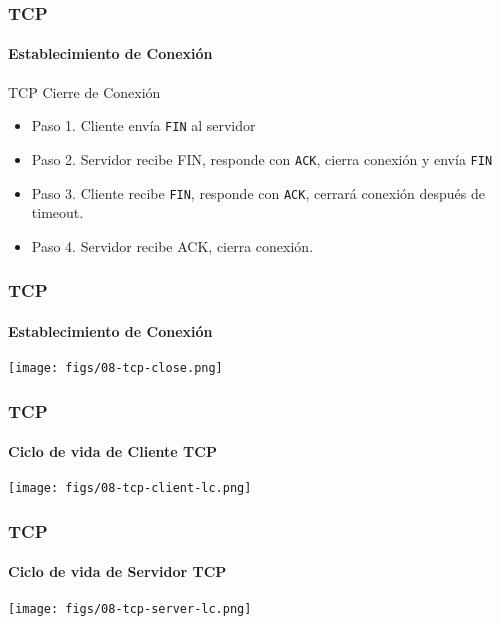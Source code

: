 \documentclass[letter]{beamer}
\begin{document}
\begin{frame}
  \frametitle{TCP}
  \framesubtitle{Establecimiento de Conexión}
  TCP Cierre de Conexión
  \begin{itemize}
    \item Paso 1. Cliente envía {\tt FIN} al servidor
    \item Paso 2. Servidor recibe FIN, responde con {\tt ACK}, cierra conexión y envía {\tt FIN}
    \item Paso 3. Cliente recibe {\tt FIN}, responde con {\tt ACK}, cerrará conexión después de timeout.
    \item Paso 4. Servidor recibe ACK, cierra conexión.
  \end{itemize}

\end{frame}
\begin{frame}
  \frametitle{TCP}
  \framesubtitle{Establecimiento de Conexión}

  \begin{center}
    \texttt{[image: figs/08-tcp-close.png]}
  \end{center}


\end{frame}

\begin{frame}
  \frametitle{TCP}
  \framesubtitle{Ciclo de vida de Cliente TCP}

  \begin{center}
    \texttt{[image: figs/08-tcp-client-lc.png]}
  \end{center}

\end{frame}
\begin{frame}
  \frametitle{TCP}
  \framesubtitle{Ciclo de vida de Servidor TCP}

  \begin{center}
    \texttt{[image: figs/08-tcp-server-lc.png]}
  \end{center}

\end{frame}
\end{document}
